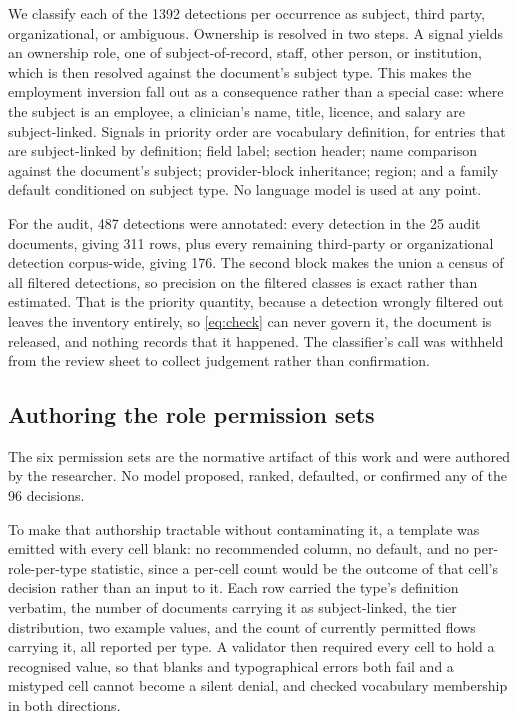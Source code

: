 \documentclass[conference]{IEEEtran}
\begin{document}
We classify each of the 1392 detections per occurrence as subject, third party,
organizational, or ambiguous. Ownership is resolved in two steps. A signal
yields an ownership role, one of subject-of-record, staff, other person, or
institution, which is then resolved against the document's subject type. This
makes the employment inversion fall out as a consequence rather than a special
case: where the subject is an employee, a clinician's name, title, licence, and
salary are subject-linked. Signals in priority order are vocabulary definition,
for entries that are subject-linked by definition; field label; section header;
name comparison against the document's subject; provider-block inheritance;
region; and a family default conditioned on subject type. No language model is
used at any point.

For the audit, 487 detections were annotated: every detection in the 25 audit
documents, giving 311 rows, plus every remaining third-party or organizational
detection corpus-wide, giving 176. The second block makes the union a census of
all filtered detections, so precision on the filtered classes is exact rather
than estimated. That is the priority quantity, because a detection wrongly
filtered out leaves the inventory entirely, so \eqref{eq:check} can never govern
it, the document is released, and nothing records that it happened. The
classifier's call was withheld from the review sheet to collect judgement rather
than confirmation.

\subsection{Authoring the role permission sets}
\label{sec:authoring}
The six permission sets are the normative artifact of this work and were
authored by the researcher. No model proposed, ranked, defaulted, or confirmed
any of the 96 decisions.

To make that authorship tractable without contaminating it, a template was
emitted with every cell blank: no recommended column, no default, and no
per-role-per-type statistic, since a per-cell count would be the outcome of that
cell's decision rather than an input to it. Each row carried the type's
definition verbatim, the number of documents carrying it as subject-linked, the
tier distribution, two example values, and the count of currently permitted
flows carrying it, all reported per type. A validator then required every cell
to hold a recognised value, so that blanks and typographical errors both fail
and a mistyped cell cannot become a silent denial, and checked vocabulary
membership in both directions.
\end{document}
